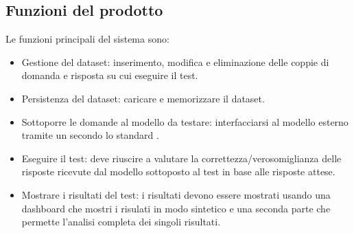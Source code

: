 
\subsection{Funzioni del prodotto}
Le funzioni principali del sistema sono:
\begin{itemize}
    \item Gestione del dataset: inserimento, modifica e eliminazione delle coppie di domanda e risposta su cui eseguire il test.
    \item Persistenza del dataset: caricare e memorizzare il dataset.
    \item Sottoporre le domande al modello da testare: interfacciarsi al modello esterno tramite un  secondo lo standard .
    \item Eseguire il test: deve riuscire a valutare la correttezza/verosomiglianza delle risposte ricevute dal modello sottoposto al test in base alle risposte attese.
    \item Mostrare i risultati del test: i risultati devono essere mostrati usando una dashboard che mostri i risulati in modo sintetico e una seconda parte che permette l'analisi completa dei singoli risultati.
\end{itemize}